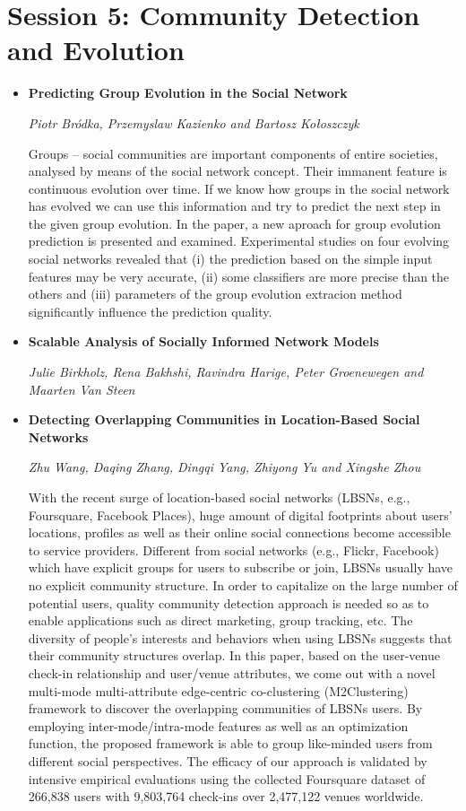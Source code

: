 \documentclass[a4paper,12pt,svgnames]{report}
\begin{document}
\section{Session 5: Community Detection and Evolution}
\begin{itemize}

\item \textbf{Predicting Group Evolution in the Social Network}

\textit{Piotr Bródka, Przemyslaw Kazienko and Bartosz Kołoszczyk}

Groups – social communities are important components of entire societies,
analysed by means of the social network concept. Their immanent feature is
continuous evolution over time. If we know how groups in the social network has
evolved we can use this information and try to predict the next step in the
given group evolution. In the paper, a new aproach for group evolution
prediction is presented and examined. Experimental studies on four evolving
social networks revealed that (i) the prediction based on the simple input
features may be very accurate, (ii) some classifiers are more precise than the
others and (iii) parameters of the group evolution extracion method
significantly influence the prediction quality.


\item \textbf{Scalable Analysis of Socially Informed Network Models}

\textit{Julie Birkholz, Rena Bakhshi, Ravindra Harige, Peter Groenewegen and
Maarten Van Steen}

\item \textbf{Detecting Overlapping Communities in Location-Based Social
Networks}

\textit{Zhu Wang, Daqing Zhang, Dingqi Yang, Zhiyong Yu and Xingshe Zhou}

With the recent surge of location-based social networks (LBSNs, e.g.,
Foursquare, Facebook Places), huge amount of digital footprints about users'
locations, profiles as well as their online social connections become accessible
to service providers. Different from social networks (e.g., Flickr, Facebook)
which have explicit groups for users to subscribe or join, LBSNs usually have no
explicit community structure. In order to capitalize on the large number of
potential users, quality community detection approach is needed so as to enable
applications such as direct marketing, group tracking, etc. The diversity of
people's interests and behaviors when using LBSNs suggests that their community
structures overlap. In this paper, based on the user-venue check-in relationship
and user/venue attributes, we come out with a novel multi-mode multi-attribute
edge-centric co-clustering (M2Clustering) framework to discover the overlapping
communities of LBSNs users. By employing inter-mode/intra-mode features as well
as an optimization function, the proposed framework is able to group like-minded
users from different social perspectives. The efficacy of our approach is
validated by intensive empirical evaluations using the collected Foursquare
dataset of 266,838 users with 9,803,764 check-ins over 2,477,122 venues
worldwide.


\end{itemize}
\end{document}
